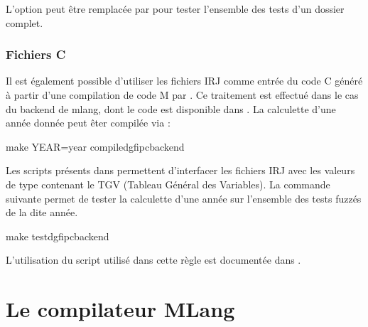 \documentclass[letterpaper,10pt,french]{sphinxmanual}
\begin{document}
\sphinxAtStartPar
L’option  peut être remplacée par  pour tester l’ensemble des tests d’un
dossier complet.


\subsubsection{Fichiers C}
\label{\detokenize{syntax_irj:fichiers-c}}
\sphinxAtStartPar
Il est également possible d’utiliser les fichiers IRJ comme entrée du code C
généré à partir d’une compilation de code M par .
Ce traitement est effectué dans le cas du backend  de mlang, dont
le code est disponible dans .
La calculette d’une année donnée peut êter compilée via :

\begin{sphinxVerbatim}[commandchars=\\\{\}]
\PYGZdl{} make YEAR=year compile\PYGZus{}dgfip\PYGZus{}c\PYGZus{}backend
\end{sphinxVerbatim}

\sphinxAtStartPar
Les scripts présents dans  permettent
d’interfacer les fichiers IRJ avec les valeurs  de type  contenant
le TGV (Tableau Général des Variables).
La commande suivante permet de tester la calculette d’une année sur l’ensemble
des tests fuzzés de la dite année.

\begin{sphinxVerbatim}[commandchars=\\\{\}]
\PYGZdl{} make test\PYGZus{}dgfip\PYGZus{}c\PYGZus{}backend
\end{sphinxVerbatim}

\sphinxAtStartPar
L’utilisation du script  utilisé dans cette règle est documentée dans
.

\sphinxstepscope


\section{Le compilateur MLang}
\label{\detokenize{mlang:le-compilateur-mlang}}\label{\detokenize{mlang:mlang}}\label{\detokenize{mlang::doc}}
\end{document}
